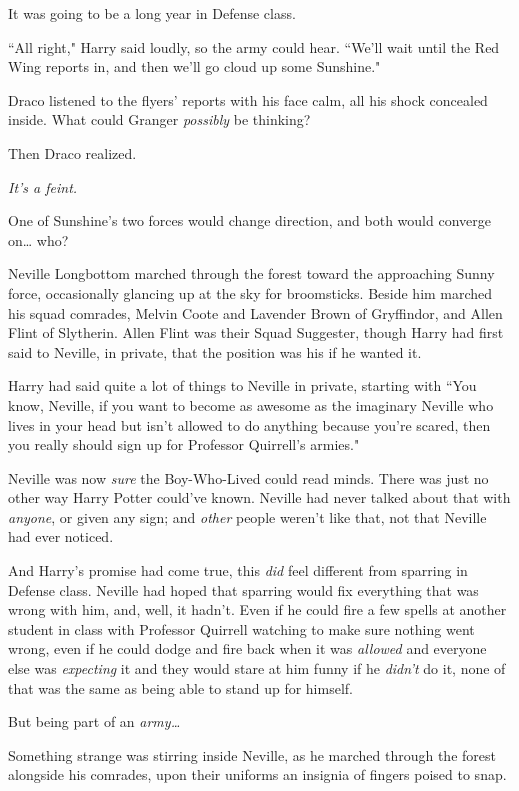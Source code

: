 It was going to be a long year in Defense class.

``All right," Harry said loudly, so the army could hear. ``We'll wait until the Red Wing reports in, and then we'll go cloud up some Sunshine."

\later

Draco listened to the flyers' reports with his face calm, all his shock concealed inside. What could Granger \emph{possibly} be thinking?

Then Draco realized.

\emph{It's a feint.}

One of Sunshine's two forces would change direction, and both would converge on{\ldots} who?

\later

Neville Longbottom marched through the forest toward the approaching Sunny force, occasionally glancing up at the sky for broomsticks. Beside him marched his squad comrades, Melvin Coote and Lavender Brown of Gryffindor, and Allen Flint of Slytherin. Allen Flint was their Squad Suggester, though Harry had first said to Neville, in private, that the position was his if he wanted it.

Harry had said quite a lot of things to Neville in private, starting with ``You know, Neville, if you want to become as awesome as the imaginary Neville who lives in your head but isn't allowed to do anything because you're scared, then you really should sign up for Professor Quirrell's armies."

Neville was now \emph{sure} the Boy-Who-Lived could read minds. There was just no other way Harry Potter could've known. Neville had never talked about that with \emph{anyone}, or given any sign; and \emph{other} people weren't like that, not that Neville had ever noticed.

And Harry's promise had come true, this \emph{did} feel different from sparring in Defense class. Neville had hoped that sparring would fix everything that was wrong with him, and, well, it hadn't. Even if he could fire a few spells at another student in class with Professor Quirrell watching to make sure nothing went wrong, even if he could dodge and fire back when it was \emph{allowed} and everyone else was \emph{expecting} it and they would stare at him funny if he \emph{didn't} do it, none of that was the same as being able to stand up for himself.

But being part of an \emph{army{\ldots}}

Something strange was stirring inside Neville, as he marched through the forest alongside his comrades, upon their uniforms an insignia of fingers poised to snap.

